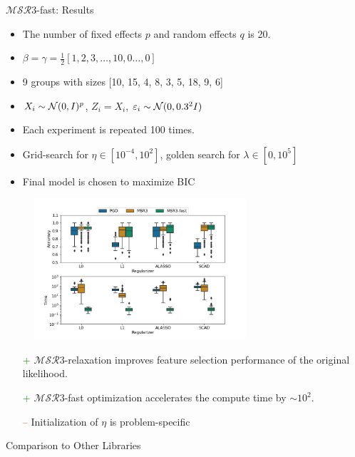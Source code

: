 \documentclass[8pt]{beamer}
\newcommand{\ouralgo}{\ensuremath{\mathcal{MSR}3}}
\begin{document}
\begin{frame}{$\ouralgo$-fast: Results}
\begin{itemize}
	\item The number of fixed effects $p$ and random effects $q$ is 20.
	\item $\beta = \gamma = \frac{1}{2}[1,2,3,\dots,10, 0\dots,0]$
	\item 9 groups with sizes [10, 15, 4, 8, 3, 5, 18, 9, 6]
	\item $X_i \sim \operatorname{\mathcal{N}}(0, I)^p$, $Z_i = X_i$, $\varepsilon_i \sim \operatorname{\mathcal{N}}(0, 0.3^2I)$
	\item Each experiment is repeated 100 times.
	\item Grid-search for $\eta \in [10^{-4}, 10^{2}]$, golden search for $\lambda \in [0, 10^5]$
	\item Final model is chosen to maximize BIC
\end{itemize}
\begin{figure}
	\includegraphics[width=0.7\textwidth]{Figures/benchmark.jpg}
\end{figure}
\begin{itemize}
	\item[\textcolor{green}{+}] $\ouralgo$-relaxation improves feature selection performance of the original likelihood.
	\item[\textcolor{green}{+}] $\ouralgo$-fast optimization accelerates the compute time by $\sim 10^2$.
   	\item[\textcolor{red}{--}] Initialization of $\eta$ is problem-specific
\end{itemize}
\end{frame}

\begin{frame}{Comparison to Other Libraries}
\begin{table}
	
\end{table}
\end{frame}
\end{document}
